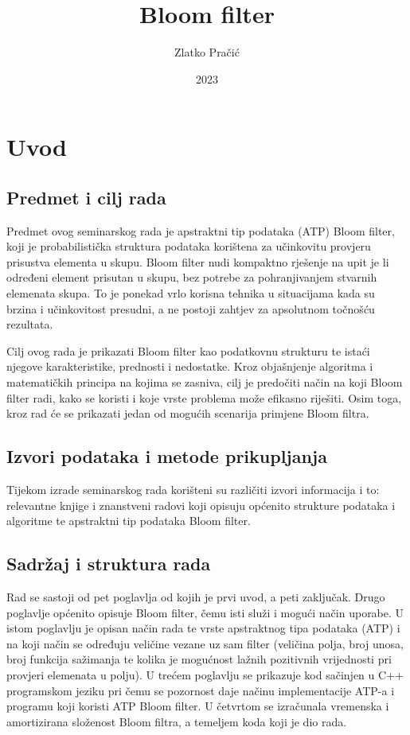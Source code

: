 \documentclass{foi}
\title{Bloom filter}
\author{Zlatko Pračić}
\date{2023}
\begin{document}
\maketitle

\tableofcontents

\pagestyle{plain}
\chapter{Uvod}

\section{Predmet i cilj rada}
Predmet ovog seminarskog rada je apstraktni tip podataka (ATP) Bloom filter, koji je probabilistička struktura podataka korištena za učinkovitu provjeru prisustva elementa u skupu. Bloom filter nudi kompaktno rješenje na upit je li određeni element prisutan u skupu, bez potrebe za pohranjivanjem stvarnih elemenata skupa. To je ponekad vrlo korisna tehnika u situacijama kada su brzina i učinkovitost presudni, a ne postoji zahtjev za apsolutnom točnošću rezultata.

Cilj ovog rada je prikazati Bloom filter kao podatkovnu strukturu te istaći njegove karakteristike, prednosti i nedostatke. Kroz objašnjenje algoritma i matematičkih principa na kojima se zasniva, cilj je predočiti način na koji Bloom filter radi, kako se koristi i koje vrste problema može efikasno riješiti. Osim toga, kroz rad će se prikazati jedan od mogućih scenarija primjene Bloom filtra.

\section{Izvori podataka i metode prikupljanja}
Tijekom izrade seminarskog rada korišteni su različiti izvori informacija i to: relevantne knjige i znanstveni radovi koji opisuju općenito strukture podataka i algoritme te apstraktni tip podataka Bloom filter.

\section{Sadržaj i struktura rada}
Rad se sastoji od pet poglavlja od kojih je prvi uvod, a peti zaključak. Drugo poglavlje općenito opisuje Bloom filter, čemu isti služi i mogući način uporabe. U istom poglavlju je opisan način rada te vrste apstraktnog tipa podataka (ATP) i na koji način se određuju veličine vezane uz sam filter (veličina polja, broj unosa, broj funkcija sažimanja te kolika je mogućnost lažnih pozitivnih vrijednosti pri provjeri elemenata u polju). U trećem poglavlju se prikazuje kod sačinjen u C++ programskom jeziku pri čemu se pozornost daje načinu implementacije ATP-a i programu koji koristi ATP Bloom filter. U četvrtom se izračunala vremenska i amortizirana složenost Bloom filtra, a temeljem koda koji je dio rada.
\end{document}
